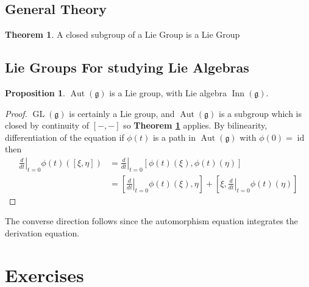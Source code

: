 \documentclass[10.5pt]{article}
\theoremstyle{definition}
\newtheorem{proposition}{Proposition}
\newtheorem{theorem}{Theorem}
\numberwithin{example}{subsection}
\numberwithin{proposition}{subsection}
\numberwithin{pb}{subsection}
\begin{document}
    \subsection{General Theory}
        \begin{theorem}\label{thmclosedsubgroup}
            A closed subgroup of a Lie Group is a Lie Group
        \end{theorem}
    \subsection{Lie Groups For studying Lie Algebras}
        \begin{proposition}\label{dergautg}
                \(\operatorname{Aut}(\mathfrak{g})\) is a Lie group, with Lie algebra \(\operatorname{Inn}(\mathfrak{g})\).
                \begin{proof}
                    \(\operatorname{GL}(\mathfrak{g})\) is certainly a Lie group, and \(\operatorname{Aut}(\mathfrak{g})\) is a subgroup which is closed by continuity of \([-,-]\) so \textbf{Theorem \ref{thmclosedsubgroup}} applies. By bilinearity, differentiation of the equation if \(\phi(t)\) is a path in \(\operatorname{Aut}(\mathfrak{g})\) with \(\phi(0) = \operatorname{id}\) then
                    \begin{align}
                        \left.\frac{d}{dt}\right\vert_{t=0}\phi(t)([\xi,\eta]) &= \left.\frac{d}{dt}\right\vert_{t=0}[\phi(t)(\xi),\phi(t)(\eta)] \\
                        &= \left[\left.\frac{d}{dt}\right\vert_{t=0}\phi(t)(\xi),\eta\right] + \left[\xi,\left.\frac{d}{dt}\right\vert_{t=0}\phi(t)(\eta)\right]
                    \end{align}
                \end{proof}
        \end{proposition}
        The converse direction follows since the automorphism equation integrates the derivation equation.

        \section{Exercises}
\end{document}
